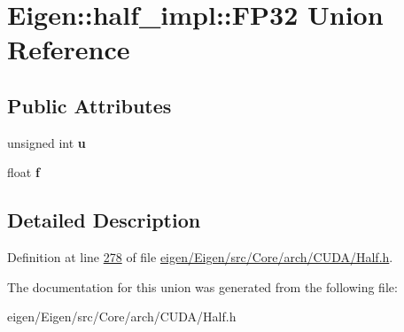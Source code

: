 \hypertarget{union_eigen_1_1half__impl_1_1_f_p32}{}\section{Eigen\+:\+:half\+\_\+impl\+:\+:F\+P32 Union Reference}
\label{union_eigen_1_1half__impl_1_1_f_p32}
\subsection*{Public Attributes}
\begin{DoxyCompactItemize}
\item 
\mbox{\label{union_eigen_1_1half__impl_1_1_f_p32_ad13f029b8bc6ba9441d161d2d660f1fa}} 
unsigned int {\bfseries u}
\item 
\mbox{\label{union_eigen_1_1half__impl_1_1_f_p32_acade4f14091fc39b02bc78f30e8a11c0}} 
float {\bfseries f}
\end{DoxyCompactItemize}


\subsection{Detailed Description}


Definition at line \hyperlink{eigen_2_eigen_2src_2_core_2arch_2_c_u_d_a_2_half_8h_source_l00278}{278} of file \hyperlink{eigen_2_eigen_2src_2_core_2arch_2_c_u_d_a_2_half_8h_source}{eigen/\+Eigen/src/\+Core/arch/\+C\+U\+D\+A/\+Half.\+h}.



The documentation for this union was generated from the following file\+:\begin{DoxyCompactItemize}
\item 
eigen/\+Eigen/src/\+Core/arch/\+C\+U\+D\+A/\+Half.\+h\end{DoxyCompactItemize}
